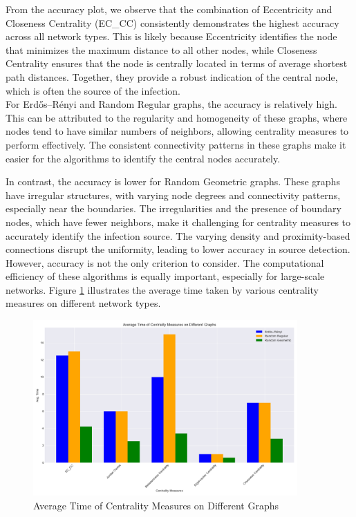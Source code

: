 From the accuracy plot, we observe that the combination of Eccentricity and Closeness Centrality (EC\_CC) consistently demonstrates the highest accuracy across all network types. This is likely because Eccentricity identifies the node that minimizes the maximum distance to all other nodes, while Closeness Centrality ensures that the node is centrally located in terms of average shortest path distances. Together, they provide a robust indication of the central node, which is often the source of the infection.\\

For Erdős–Rényi and Random Regular graphs, the accuracy is relatively high. This can be attributed to the regularity and homogeneity of these graphs, where nodes tend to have similar numbers of neighbors, allowing centrality measures to perform effectively. The consistent connectivity patterns in these graphs make it easier for the algorithms to identify the central nodes accurately.

In contrast, the accuracy is lower for Random Geometric graphs. These graphs have irregular structures, with varying node degrees and connectivity patterns, especially near the boundaries. The irregularities and the presence of boundary nodes, which have fewer neighbors, make it challenging for centrality measures to accurately identify the infection source. The varying density and proximity-based connections disrupt the uniformity, leading to lower accuracy in source detection.\\

However, accuracy is not the only criterion to consider. The computational efficiency of these algorithms is equally important, especially for large-scale networks. Figure \ref{fig:average_time_centrality_measures} illustrates the average time taken by various centrality measures on different network types.

\begin{figure}[H]
    \centering
    \includegraphics[width=0.9\textwidth]{img/Average_Time_Centrality_Measures.png}
    \caption{Average Time of Centrality Measures on Different Graphs}
    \label{fig:average_time_centrality_measures}
\end{figure}

